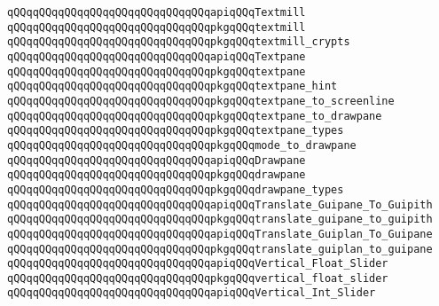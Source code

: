 \newline
\verb|qQQqqQQqqQQqqQQqqQQqqQQqqQQqqQQqapiqQQqTextmill|\newline
\verb|qQQqqQQqqQQqqQQqqQQqqQQqqQQqqQQqpkgqQQqtextmill|\newline
\verb|qQQqqQQqqQQqqQQqqQQqqQQqqQQqqQQqpkgqQQqtextmill_crypts|\newline
\newline
\verb|qQQqqQQqqQQqqQQqqQQqqQQqqQQqqQQqapiqQQqTextpane|\newline
\verb|qQQqqQQqqQQqqQQqqQQqqQQqqQQqqQQqpkgqQQqtextpane|\newline
\newline
\verb|qQQqqQQqqQQqqQQqqQQqqQQqqQQqqQQqpkgqQQqtextpane_hint|\newline
\verb|qQQqqQQqqQQqqQQqqQQqqQQqqQQqqQQqpkgqQQqtextpane_to_screenline|\newline
\verb|qQQqqQQqqQQqqQQqqQQqqQQqqQQqqQQqpkgqQQqtextpane_to_drawpane|\newline
\verb|qQQqqQQqqQQqqQQqqQQqqQQqqQQqqQQqpkgqQQqtextpane_types|\newline
\verb|qQQqqQQqqQQqqQQqqQQqqQQqqQQqqQQqpkgqQQqmode_to_drawpane|\newline
\newline
\verb|qQQqqQQqqQQqqQQqqQQqqQQqqQQqqQQqapiqQQqDrawpane|\newline
\verb|qQQqqQQqqQQqqQQqqQQqqQQqqQQqqQQqpkgqQQqdrawpane|\newline
\verb|qQQqqQQqqQQqqQQqqQQqqQQqqQQqqQQqpkgqQQqdrawpane_types|\newline
\newline
\verb|qQQqqQQqqQQqqQQqqQQqqQQqqQQqqQQqapiqQQqTranslate_Guipane_To_Guipith|\newline
\verb|qQQqqQQqqQQqqQQqqQQqqQQqqQQqqQQqpkgqQQqtranslate_guipane_to_guipith|\newline
\newline
\verb|qQQqqQQqqQQqqQQqqQQqqQQqqQQqqQQqapiqQQqTranslate_Guiplan_To_Guipane|\newline
\verb|qQQqqQQqqQQqqQQqqQQqqQQqqQQqqQQqpkgqQQqtranslate_guiplan_to_guipane|\newline
\newline
\verb|qQQqqQQqqQQqqQQqqQQqqQQqqQQqqQQqapiqQQqVertical_Float_Slider|\newline
\verb|qQQqqQQqqQQqqQQqqQQqqQQqqQQqqQQqpkgqQQqvertical_float_slider|\newline
\newline
\verb|qQQqqQQqqQQqqQQqqQQqqQQqqQQqqQQqapiqQQqVertical_Int_Slider|\newline
